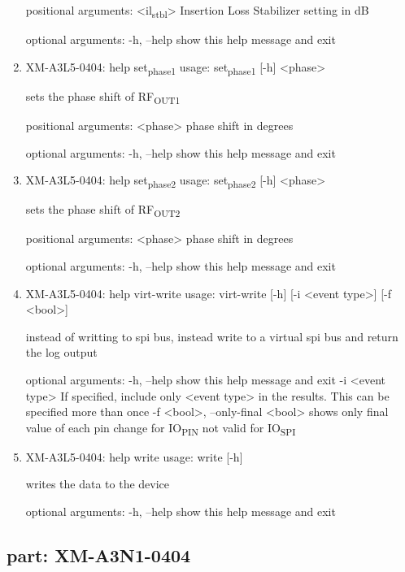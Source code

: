 \documentclass[11pt]{article}
\begin{document}
\begin{enumerate}
positional arguments:
  <il\textsubscript{stbl}>   Insertion Loss Stabilizer setting in dB

optional arguments:
  -h, --help  show this help message and exit

\item XM-A3L5-0404: help set\textsubscript{phase}\textsubscript{1}
\label{sec:org93f3e35}
usage: set\textsubscript{phase}\textsubscript{1} [-h] <phase>

sets the phase shift of RF\textsubscript{OUT1}

positional arguments:
  <phase>     phase shift in degrees

optional arguments:
  -h, --help  show this help message and exit

\item XM-A3L5-0404: help set\textsubscript{phase}\textsubscript{2}
\label{sec:org620312a}
usage: set\textsubscript{phase}\textsubscript{2} [-h] <phase>

sets the phase shift of RF\textsubscript{OUT2}

positional arguments:
  <phase>     phase shift in degrees

optional arguments:
  -h, --help  show this help message and exit

\item XM-A3L5-0404: help virt-write
\label{sec:org2d1a488}
usage: virt-write [-h] [-i <event type>] [-f <bool>]

instead of writting to spi bus, instead write to a virtual spi bus and return
the log output

optional arguments:
  -h, --help            show this help message and exit
  -i <event type>       If specified, include only <event type> in the
                        results. This can be specified more than once
  -f <bool>, --only-final <bool>
                        shows only final value of each pin change for IO\textsubscript{PIN}
                        not valid for IO\textsubscript{SPI}

\item XM-A3L5-0404: help write
\label{sec:org63dee1d}
usage: write [-h]

writes the data to the device

optional arguments:
  -h, --help  show this help message and exit
\end{enumerate}

\subsection{part: XM-A3N1-0404}
\label{sec:org72154b9}
\end{document}
